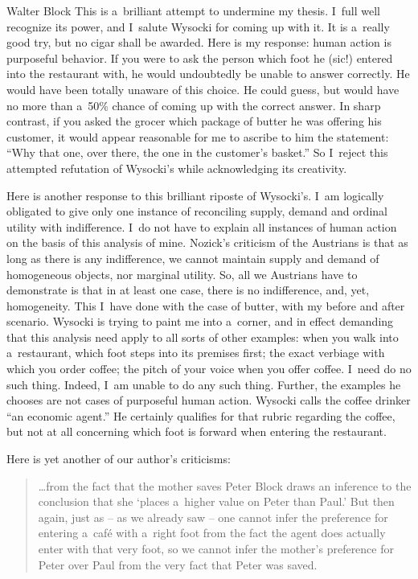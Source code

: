 \begin{artengenv}{Walter Block}
This is a~brilliant attempt to undermine my thesis. I~full well recognize its power, and I~salute Wysocki for coming up with it. It is a~really good try, but no cigar shall be awarded. Here is my response: human action is purposeful behavior. If you were to ask the person which foot he (sic!) entered into the restaurant with, he would undoubtedly be unable to answer correctly. He would have been totally unaware of this choice. He could guess, but would have no more than a~50\% chance of coming up with the correct answer. In sharp contrast, if you asked the grocer which package of butter he was offering his customer, it would appear reasonable for me to ascribe to him the statement: ``Why that one, over there, the one in the customer's basket.'' So I~reject this attempted refutation of Wysocki's while acknowledging its creativity.



Here is another response to this brilliant riposte of Wysocki's. I~am logically obligated to give only one instance of reconciling supply, demand and ordinal utility with indifference. I~do not have to explain all instances of human action on the basis of this analysis of mine. Nozick's criticism of the Austrians is that as long as there is any indifference, we cannot maintain supply and demand of homogeneous objects, nor marginal utility. So, all we Austrians have to demonstrate is that in at least one case, there is no indifference, and, yet, homogeneity. This I~have done with the case of butter, with my before and after scenario. Wysocki is trying to paint me into a~corner, and in effect demanding that this analysis need apply to all sorts of other examples: when you walk into a~restaurant, which foot steps into its premises first; the exact verbiage with which you order coffee; the pitch of your voice when you offer coffee. I~need do no such thing. Indeed, I~am unable to do any such thing. Further, the examples he chooses are not cases of purposeful human action. Wysocki calls the coffee drinker ``an economic agent.'' He certainly qualifies for that rubric regarding the coffee, but not at all concerning which foot is forward when entering the restaurant.



Here is yet another of our author's criticisms:



\begin{quote}
…from the fact that the mother saves Peter Block draws an inference to the conclusion that she ‘places a~higher value on Peter than Paul.' But then again, just as -- as we already saw -- one cannot infer the preference for entering a~café with a~right foot from the fact the agent does actually enter with that very foot, so we cannot infer the mother's preference for Peter over Paul from the very fact that Peter was saved.
\end{quote}




\end{artengenv}
